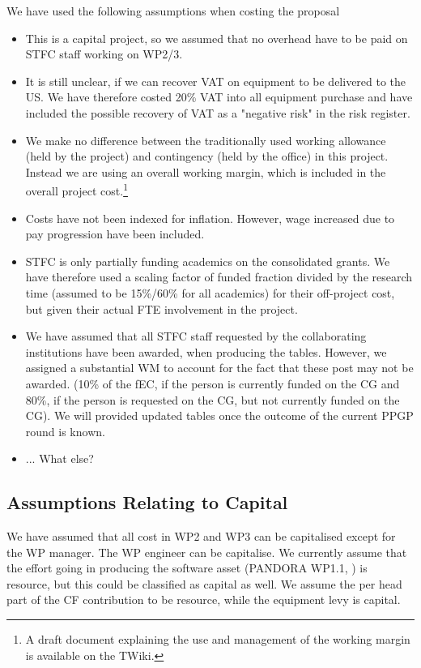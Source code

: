 We have used the following assumptions when costing the proposal
\begin{itemize}
    \item This is a capital project, so we assumed that no overhead have to be paid on STFC staff working on WP2/3. 
    \item It is still unclear, if we can recover VAT on equipment to be delivered to the US. We have therefore costed 20\% VAT into all equipment purchase and have included the possible recovery of VAT as a "negative risk" in the risk register.
    \item We make no difference between the traditionally used working allowance (held by the project) and contingency (held by the office) in this project. Instead we are using an overall working margin, which is included in the overall project cost.\footnote{A draft document explaining the use and management of the working margin is available on the TWiki.}
    \item Costs have not been indexed for inflation. However, wage increased due to pay progression have been included.
    \item STFC is only partially funding academics on the consolidated grants. We have therefore used a scaling factor of funded fraction divided by the research time (assumed to be 15\%/60\% for all academics) for their off-project cost, but given their actual FTE involvement in the project.
    \item We have assumed that all STFC staff requested by the collaborating institutions have been awarded, when producing the tables. However, we assigned a substantial WM to account for the fact that these post may not be awarded. (10\% of the fEC, if the person is currently funded on the CG and 80\%, if the person is requested on the CG, but not currently funded on the CG). We will provided updated tables once the outcome of the current PPGP round is known.
    \item ...{\color{red} What else?}
\end{itemize}

\subsection{Assumptions Relating to Capital}

We have assumed that all cost in WP2 and WP3 can be capitalised except for the WP manager. The WP engineer can be capitalise. We currently assume that the effort going in producing the software asset (PANDORA WP1.1, ) is resource, but this could be classified as capital as well. We assume the per head part of the CF contribution to be resource, while the equipment levy is capital.


